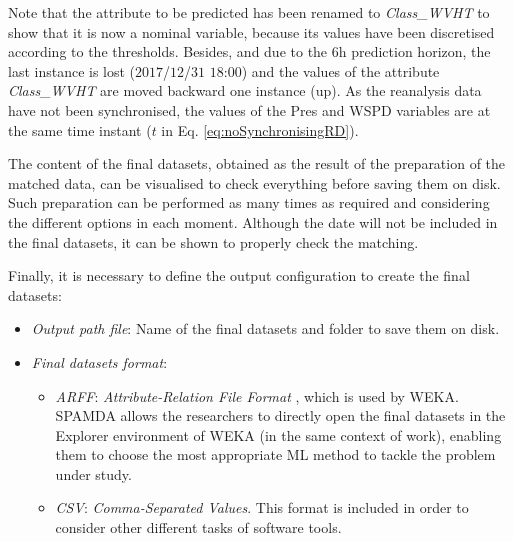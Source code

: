 \documentclass[review]{elsarticle}
\begin{document}
\begin{itemize}
						Note that the attribute to be predicted has been renamed to \textit{Class\_WVHT} to show that it is now a nominal variable, because its values have been discretised according to the thresholds. Besides, and due to the $6$h prediction horizon, the last instance is lost ($2017$/$12$/$31$ $18$:$00$) and the values of the attribute \textit{Class\_WVHT} are moved backward one instance (up). As the reanalysis data have not been synchronised, the values of the Pres and WSPD variables are at the same time instant ($t$ in Eq. \ref{eq:noSynchronisingRD}).
						
					\end{itemize}
				
				The content of the final datasets, obtained as the result of the preparation of the matched data, can be visualised to check everything before saving them on disk. Such preparation can be performed as many times as required and considering the different options in each moment. Although the date will not be included in the final datasets, it can be shown to properly check the matching.
				
				Finally, it is necessary to define the output configuration to create the final datasets:			
				\begin{itemize}

					\item \textit{Output path file}: Name of the final datasets and folder to save them on disk.
						
					\item \textit{Final datasets format}:

						\begin{itemize}
						
							\item \textit{ARFF}: \textit{Attribute-Relation File Format} \cite{WEKA_ARFF}, which is used by WEKA. SPAMDA allows the researchers to directly open the final datasets in the Explorer environment of WEKA (in the same context of work), enabling them to choose the most appropriate ML method to tackle the problem under study.

							\item \textit{CSV}: \textit{Comma-Separated Values}. This format is included in order to consider other different tasks of software tools.
							
						\end{itemize}
					
				\end{itemize}
				
\end{document}
